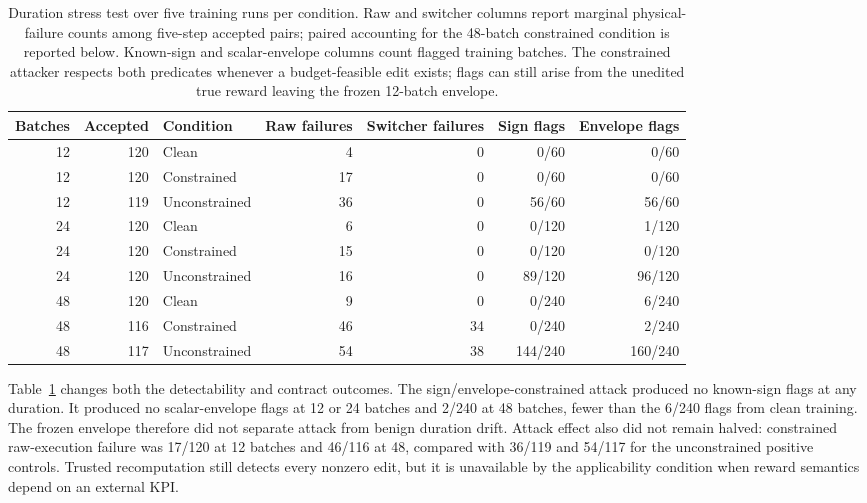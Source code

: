 \begin{table}[t]
\centering
\caption{Duration stress test over five training runs per condition.  Raw and
switcher columns report marginal physical-failure counts among five-step
accepted pairs; paired accounting for the 48-batch constrained condition is
reported below.
Known-sign and scalar-envelope columns count flagged training batches.  The
constrained attacker respects both predicates whenever a budget-feasible edit
exists; flags can still arise from the unedited true reward leaving the frozen
12-batch envelope.}
\label{tab:duration-sweep}
\small
\begin{tabular}{@{}rrlrrrr@{}}
\toprule
Batches & Accepted & Condition & Raw failures & Switcher failures & Sign flags & Envelope flags\\
\midrule
12 & 120 & Clean & 4 & 0 & 0/60 & 0/60\\
12 & 120 & Constrained & 17 & 0 & 0/60 & 0/60\\
12 & 119 & Unconstrained & 36 & 0 & 56/60 & 56/60\\
24 & 120 & Clean & 6 & 0 & 0/120 & 1/120\\
24 & 120 & Constrained & 15 & 0 & 0/120 & 0/120\\
24 & 120 & Unconstrained & 16 & 0 & 89/120 & 96/120\\
48 & 120 & Clean & 9 & 0 & 0/240 & 6/240\\
48 & 116 & Constrained & 46 & 34 & 0/240 & 2/240\\
48 & 117 & Unconstrained & 54 & 38 & 144/240 & 160/240\\
\bottomrule
\end{tabular}
\end{table}

Table~\ref{tab:duration-sweep} changes both the detectability and contract
outcomes.  The sign/envelope-constrained attack produced no known-sign flags at any
duration.  It produced no scalar-envelope flags at 12 or 24 batches and 2/240
at 48 batches, fewer than the 6/240 flags from clean training.  The frozen
envelope therefore did not separate attack from benign duration drift.  Attack
effect also did not remain halved: constrained raw-execution failure was 17/120
at 12 batches and 46/116 at 48, compared with 36/119 and 54/117 for the
unconstrained positive controls.  Trusted recomputation still detects every
nonzero edit, but it is unavailable by the applicability condition when reward
semantics depend on an external KPI.

